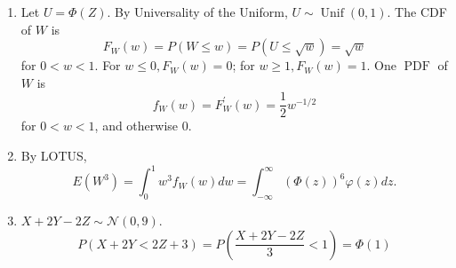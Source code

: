 

\setcounter{theorem}{56}
\begin{exercise}[BH.5.57]
\begin{solution}
    \begin{enumerate}
        \item  Let $U=\Phi(Z)$. By Universality of the Uniform, $U \sim \operatorname{Unif}(0,1)$. The CDF of $W$ is
        $$
        F_W(w)=P(W \leq w)=P(U \leq \sqrt{w})=\sqrt{w}
        $$
        for $0<w<1$. For $w \leq 0, F_W(w)=0$; for $w \geq 1, F_W(w)=1$. One $\operatorname{PDF}$ of $W$ is
        $$
        f_W(w)=F_W^{\prime}(w)=\frac{1}{2} w^{-1 / 2}
        $$
        for $0<w<1$, and  otherwise 0.
        \item  By LOTUS,
        $$
        E\left(W^3\right)=\int_0^1 w^3 f_W(w) d w=\int_{-\infty}^{\infty}(\Phi(z))^6 \varphi(z) d z .
        $$
        \item $X+2 Y-2 Z \sim \mathcal{N}(0,9)$.  
        $$
        P(X+2 Y<2 Z+3)=P\left(\frac{X+2 Y-2 Z}{3}<1\right)=\Phi(1)
        $$
    \end{enumerate}
\end{solution}
\end{exercise}


